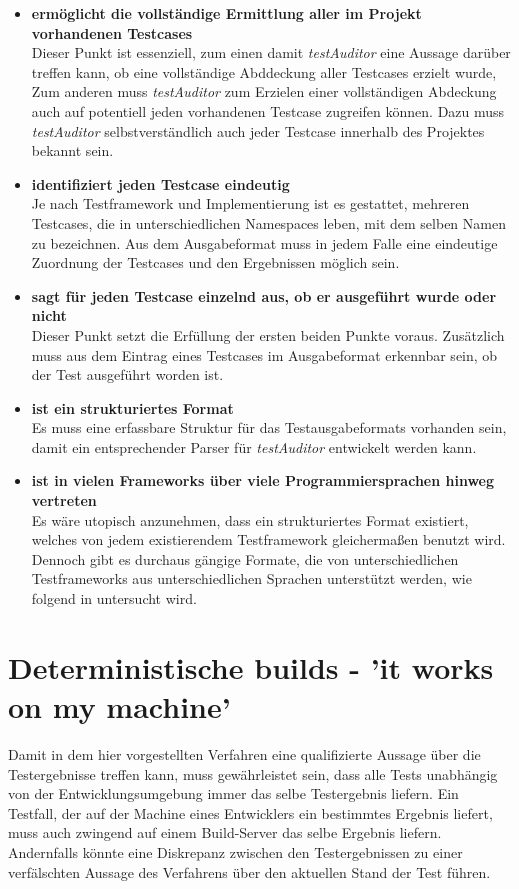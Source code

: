 \begin{itemize}
    \item \textbf{ermöglicht die vollständige Ermittlung aller im Projekt vorhandenen Testcases}\\
    Dieser Punkt ist essenziell, zum einen damit \textit{testAuditor} eine Aussage darüber treffen kann, ob eine vollständige Abddeckung aller Testcases erzielt wurde, Zum anderen muss \textit{testAuditor} zum Erzielen einer vollständigen Abdeckung auch auf potentiell jeden vorhandenen Testcase zugreifen können. Dazu muss \textit{testAuditor} selbstverständlich auch jeder Testcase innerhalb des Projektes bekannt sein.
    \item \textbf{identifiziert jeden Testcase eindeutig}\\
    Je nach Testframework und Implementierung ist es gestattet, mehreren Testcases, die in unterschiedlichen Namespaces leben, mit dem selben Namen zu bezeichnen. Aus dem Ausgabeformat muss in jedem Falle eine eindeutige Zuordnung der Testcases und den Ergebnissen möglich sein. 
    \item \textbf{sagt für jeden Testcase einzelnd aus, ob er ausgeführt wurde oder nicht}\\
    Dieser Punkt setzt die Erfüllung der ersten beiden Punkte voraus. Zusätzlich muss aus dem Eintrag eines Testcases im Ausgabeformat erkennbar sein, ob der Test ausgeführt worden ist.
    \item \textbf{ist ein strukturiertes Format}\\
    Es muss eine erfassbare Struktur für das Testausgabeformats vorhanden sein, damit ein entsprechender Parser für \textit{testAuditor} entwickelt werden kann.
    \item \textbf{ist in vielen Frameworks über viele Programmiersprachen hinweg vertreten}\\
    Es wäre utopisch anzunehmen, dass ein strukturiertes Format existiert, welches von jedem existierendem Testframework gleichermaßen benutzt wird. Dennoch gibt es durchaus gängige Formate, die von unterschiedlichen Testframeworks aus unterschiedlichen Sprachen unterstützt werden, wie folgend in  untersucht wird. 
\end{itemize}

\section{Deterministische builds - 'it works on my machine'}
Damit in dem hier vorgestellten Verfahren eine qualifizierte Aussage über die Testergebnisse treffen kann, muss gewährleistet sein, dass alle Tests unabhängig von der Entwicklungsumgebung immer das selbe Testergebnis liefern. Ein Testfall, der auf der Machine eines Entwicklers ein bestimmtes Ergebnis liefert, muss auch zwingend auf einem Build-Server das selbe Ergebnis liefern. Andernfalls könnte eine Diskrepanz zwischen den Testergebnissen zu einer verfälschten Aussage des Verfahrens über den aktuellen Stand der Test führen. 

